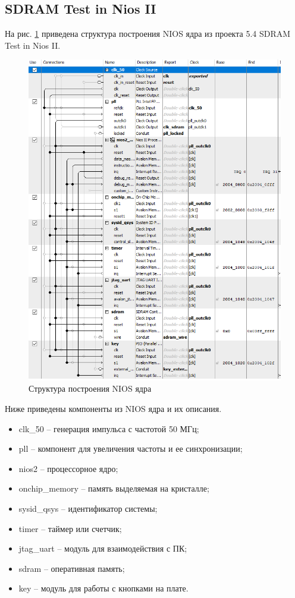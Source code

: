 \documentclass[a4paper,14pt]{article}
\begin{document}
	\subsection{SDRAM Test in Nios II} 
	
	На рис. \ref{fig:niossh1} приведена структура построения NIOS ядра из проекта 5.4 SDRAM Test in Nios II.
	
	\begin{figure}[H]
		\centering
		\includegraphics[width=0.7\linewidth]{images/nios_sh_1}
		\caption{Структура построения NIOS ядра}
		\label{fig:niossh1}
	\end{figure}
	
	Ниже приведены компоненты из NIOS ядра и их описания.
	
	\begin{itemize}
		
		\item clk\_50 -- генерация импульса с частотой 50 МГц;
		
		\item pll -- компонент для увеличения частоты и ее синхронизации;
		
		\item nios2 -- процессорное ядро;
		
		\item onchip\_memory -- память выделяемая на кристалле;
		
		\item sysid\_qsys -- идентификатор системы;
		
		\item timer -- таймер или счетчик;
		
		\item jtag\_uart -- модуль для взаимодействия с ПК;
		
		\item sdram -- оперативная память;
		
		\item key -- модуль для работы с кнопками на плате.
		
	\end{itemize}
\end{document}

